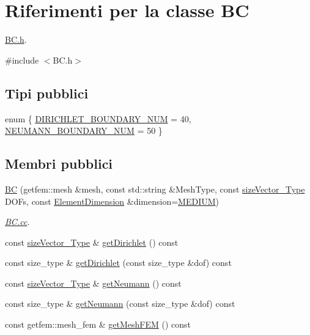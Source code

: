 \hypertarget{classBC}{\section{Riferimenti per la classe B\-C}
\label{classBC}
}


\hyperlink{BC_8h}{B\-C.\-h}.  




{\ttfamily \#include $<$B\-C.\-h$>$}

\subsection*{Tipi pubblici}
\begin{DoxyCompactItemize}
\item 
enum \{ \hyperlink{classBC_ad1b507696802f73b95c0ca59f4c41390a99103ccd54ba29b1bd2670cc6cd0c462}{D\-I\-R\-I\-C\-H\-L\-E\-T\-\_\-\-B\-O\-U\-N\-D\-A\-R\-Y\-\_\-\-N\-U\-M} = 40, 
\hyperlink{classBC_ad1b507696802f73b95c0ca59f4c41390a432aa77a00d8eb4929463ef8d57b5c04}{N\-E\-U\-M\-A\-N\-N\-\_\-\-B\-O\-U\-N\-D\-A\-R\-Y\-\_\-\-N\-U\-M} = 50
 \}
\end{DoxyCompactItemize}
\subsection*{Membri pubblici}
\begin{DoxyCompactItemize}
\item 
\hyperlink{classBC_a958daa5fc4cb0737ff9110c8037a09e7}{B\-C} (getfem\-::mesh \&mesh, const std\-::string \&Mesh\-Type, const \hyperlink{Core_8h_a83c51913d041a5001e8683434c09857f}{size\-Vector\-\_\-\-Type} D\-O\-Fs, const \hyperlink{Core_8h_a419d7707e418f02d8daeb1fc7c0b9ae5}{Element\-Dimension} \&dimension=\hyperlink{Core_8h_a419d7707e418f02d8daeb1fc7c0b9ae5a5340ec7ecef6cc3886684a3bd3450d64}{M\-E\-D\-I\-U\-M})
\begin{DoxyCompactList}\small\item\em \hyperlink{BC_8cc}{B\-C.\-cc}. \end{DoxyCompactList}\item 
const \hyperlink{Core_8h_a83c51913d041a5001e8683434c09857f}{size\-Vector\-\_\-\-Type} \& \hyperlink{classBC_af2d22ae9848e3bed61f2106610bde5b7}{get\-Dirichlet} () const 
\item 
const size\-\_\-type \& \hyperlink{classBC_ae61f04dfbb377e38e4c43e0516e51c36}{get\-Dirichlet} (const size\-\_\-type \&dof) const 
\item 
const \hyperlink{Core_8h_a83c51913d041a5001e8683434c09857f}{size\-Vector\-\_\-\-Type} \& \hyperlink{classBC_a9541adfa180ca9783052349c373b0228}{get\-Neumann} () const 
\item 
const size\-\_\-type \& \hyperlink{classBC_a88bd7cd141cda536ce128f13b17d61b5}{get\-Neumann} (const size\-\_\-type \&dof) const 
\item 
const getfem\-::mesh\-\_\-fem \& \hyperlink{classBC_a920bf87c4fe5c10289923859f3ca7afc}{get\-Mesh\-F\-E\-M} () const 
\end{DoxyCompactItemize}


